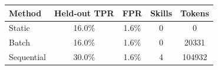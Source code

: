 \begin{tabular}{lcccc}
\toprule
Method & Held-out TPR & FPR & Skills & Tokens \\
\midrule
Static & 16.0\% & 1.6\% & 0 & 0 \\
Batch & 16.0\% & 1.6\% & 0 & 20331 \\
Sequential & 30.0\% & 1.6\% & 4 & 104932 \\
\bottomrule
\end{tabular}
